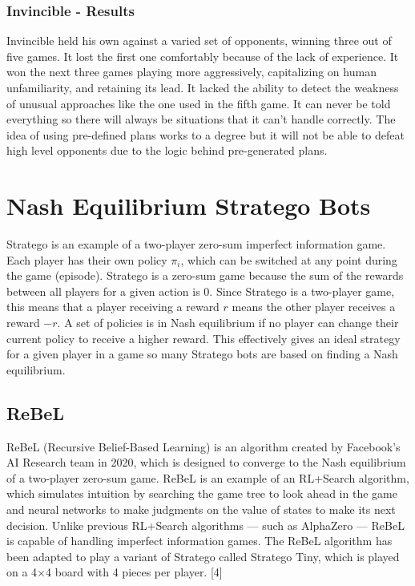 \documentclass{article}
\begin{document}
\subsubsection{Invincible - Results}

Invincible held his own against a varied set of opponents, winning three out of five games. It lost the first one comfortably because of the lack of experience. 
It won the next three games playing more aggressively, capitalizing on human unfamiliarity, and retaining its lead. 
It lacked the ability to detect the weakness of unusual approaches like the one used in the fifth game. 
It can never be told everything so there will always be situations that it can’t handle correctly. 
The idea of using pre-defined plans works to a degree but it will not be able to defeat high level opponents due to the logic behind pre-generated plans. 

\section{Nash Equilibrium Stratego Bots}

Stratego is an example of a two-player zero-sum imperfect information game. Each player has their own policy $\pi_i$, which can be switched at any point during the game (episode). 
Stratego is a zero-sum game because the sum of the rewards between all players for a given action is 0. 
Since Stratego is a two-player game, this means that a player receiving a reward $r$ means the other player receives a reward $-r$. 
A set of policies is in Nash equilibrium if no player can change their current policy to receive a higher reward. 
This effectively gives an ideal strategy for a given player in a game so many Stratego bots are based on finding a Nash equilibrium. 

\subsection{ReBeL}

ReBeL (Recursive Belief-Based Learning) is an algorithm created by Facebook’s AI Research team in 2020, which is designed to converge to the Nash equilibrium of a two-player zero-sum game. 
ReBeL is an example of an RL+Search algorithm, which simulates intuition by searching the game tree to look ahead in the game and neural networks to make judgments on the value of states to make its next decision. 
Unlike previous RL+Search algorithms --- such as AlphaZero --- ReBeL is capable of handling imperfect information games. 
The ReBeL algorithm has been adapted to play a variant of Stratego called Stratego Tiny, which is played on a 4$\times$4 board with 4 pieces per player. [4]
\end{document}
